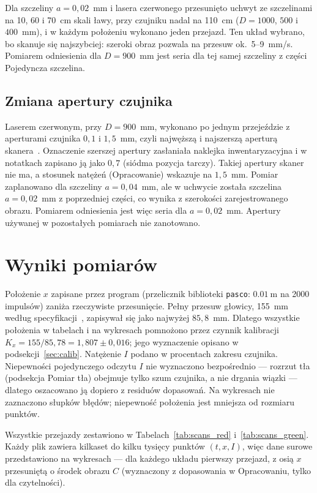 \documentclass[12pt, a4paper]{article}
\begin{document}
Dla szczeliny $a = 0{,}02$~mm i lasera czerwonego przesunięto uchwyt ze szczelinami
na 10, 60 i 70~cm skali ławy, przy czujniku nadal na 110~cm ($D = 1000$, $500$ i $400$~mm),
i w każdym położeniu wykonano jeden przejazd. Ten układ wybrano, bo skanuje się
najszybciej: szeroki obraz pozwala na przesuw ok.\ 5--9~mm/s. Pomiarem odniesienia
dla $D = 900$~mm jest seria dla tej samej szczeliny z części Pojedyncza szczelina.

\subsection{Zmiana apertury czujnika}

Laserem czerwonym, przy $D = 900$~mm, wykonano po jednym przejeździe z aperturami
czujnika $0{,}1$ i $1{,}5$~mm, czyli najwęższą i najszerszą aperturą skanera~\cite{pasco}.
Oznaczenie szerszej apertury zasłaniała naklejka inwentaryzacyjna i w notatkach zapisano ją
jako $0{,}7$ (siódma pozycja tarczy). Takiej apertury skaner nie ma, a stosunek natężeń
(Opracowanie) wskazuje na $1{,}5$~mm. Pomiar zaplanowano dla szczeliny $a = 0{,}04$~mm, ale
w uchwycie została szczelina $a = 0{,}02$~mm z poprzedniej części, co wynika z szerokości
zarejestrowanego obrazu. Pomiarem odniesienia jest więc seria dla $a = 0{,}02$~mm.
Apertury używanej w pozostałych pomiarach nie zanotowano.

\section{Wyniki pomiarów}

Położenie $x$ zapisane przez program (przelicznik biblioteki \texttt{pasco}: $\SI{0.01}{\meter}$
na 2000 impulsów) zaniża rzeczywiste przesunięcie. Pełny przesuw głowicy, 155~mm według
specyfikacji~\cite{pasco}, zapisywał się jako najwyżej $85{,}8$~mm. Dlatego wszystkie położenia
w tabelach i na wykresach pomnożono przez czynnik kalibracji
$K_x = 155/85{,}78 = 1{,}807 \pm 0{,}016$; jego wyznaczenie opisano w
podsekcji~\ref{sec:calib}. Natężenie $I$ podano
w procentach zakresu czujnika. Niepewności pojedynczego odczytu $I$ nie wyznaczono
bezpośrednio --- rozrzut tła (podsekcja Pomiar tła) obejmuje tylko szum czujnika,
a nie drgania wiązki --- dlatego oszacowano ją dopiero z residuów dopasowań. Na wykresach
nie zaznaczono słupków błędów; niepewność położenia jest mniejsza od rozmiaru punktów.

Wszystkie przejazdy zestawiono w Tabelach~\ref{tab:scans_red} i~\ref{tab:scans_green}.
Każdy plik zawiera kilkaset do kilku tysięcy punktów $(t, x, I)$, więc dane surowe
przedstawiono na wykresach --- dla każdego układu pierwszy przejazd, z osią $x$ przesuniętą
o środek obrazu $C$ (wyznaczony z dopasowania w Opracowaniu, tylko dla czytelności).
\end{document}
